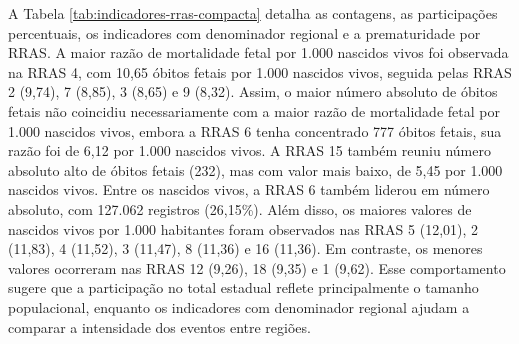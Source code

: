 A Tabela \ref{tab:indicadores-rras-compacta} detalha as contagens, as
participações percentuais, os indicadores com denominador regional e a prematuridade
por RRAS. A maior razão de mortalidade fetal por 1.000 nascidos vivos foi observada 
na RRAS 4, com 10,65 óbitos fetais por 1.000 nascidos vivos, seguida pelas RRAS 2 
(9,74), 7 (8,85), 3 (8,65) e 9 (8,32). Assim, o maior número absoluto de óbitos fetais 
não coincidiu necessariamente com a maior razão de mortalidade fetal por 1.000
nascidos vivos, embora a RRAS 6 tenha concentrado 777 óbitos fetais, sua razão
foi de 6,12 por 1.000 nascidos vivos. A RRAS 15 também reuniu número absoluto
alto de óbitos fetais (232), mas com valor mais baixo, de 5,45 por 1.000 nascidos vivos. 
Entre os nascidos vivos, a RRAS 6 também liderou em número absoluto, com 127.062 
registros (26,15\%). Além disso, os maiores valores de nascidos vivos por 1.000
habitantes foram observados nas RRAS 5 (12,01), 2 (11,83), 4 (11,52), 3 (11,47),
8 (11,36) e 16 (11,36). Em contraste, os menores valores ocorreram nas RRAS 12
(9,26), 18 (9,35) e 1 (9,62). Esse comportamento sugere que a participação no total
estadual reflete principalmente o tamanho populacional, enquanto os indicadores
com denominador regional ajudam a comparar a intensidade dos eventos entre regiões.

